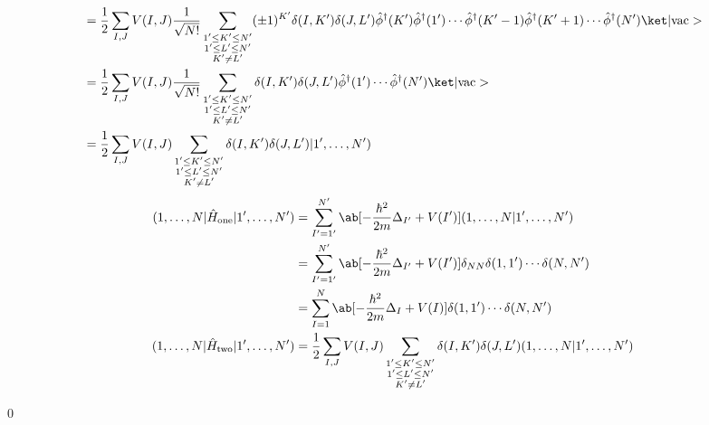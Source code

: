 \documentclass[uplatex,dvipdfmx,a4paper,11pt]{jlreq}
\makeatletter
\numberwithin{equation}{section}
\theoremstyle{definition}
\renewenvironment{proof}[1][\proofname]{\par
  \normalfont
  \topsep6\p@\@plus6\p@ \trivlist
  \item[\hskip\labelsep{\bfseries #1}\@addpunct{\bfseries}]\ignorespaces\quad\par
}{
  \qed\endtrivlist\@endpefalse
}
\renewcommand\proofname{証明}
\makeatother
\begin{document}
\begin{proof}
\begin{align}
     & = \frac{1}{2}\sum_{I,J}V(I, J)\frac{1}{\sqrt{N!}}\sum_{\substack{1'\leq K'\leq N'                                                                                                                                                                                                  \\ 1'\leq L'\leq N' \\ K' \neq L'}}(\pm 1)^{K'}\delta(I, K')\delta(J, L')\hat{\phi}^\dagger(K')\hat{\phi}^\dagger(1')\cdots\hat{\phi}^\dagger(K' - 1)\hat{\phi}^\dagger(K' + 1)\cdots\hat{\phi}^\dagger(N')\ket|\mathrm{vac}>                                                                        \\
     & = \frac{1}{2}\sum_{I,J}V(I, J)\frac{1}{\sqrt{N!}}\sum_{\substack{1'\leq K'\leq N'                                                                                                                                                                                                  \\ 1'\leq L'\leq N' \\ K' \neq L'}}\delta(I, K')\delta(J, L')\hat{\phi}^\dagger(1')\cdots\hat{\phi}^\dagger(N')\ket|\mathrm{vac}>                                                                        \\
     & = \frac{1}{2}\sum_{I,J}V(I, J)\sum_{\substack{1'\leq K'\leq N'                                                                                                                                                                                                                     \\ 1'\leq L'\leq N' \\ K' \neq L'}}\delta(I, K')\delta(J, L')|1',\ldots,N')
  \end{align}
  \begin{align}
    (1,\ldots,N|\hat{H}_{\mathrm{one}}|1',\ldots,N') & = \sum_{I' = 1'}^{N'}\ab[-\frac{\hbar^2}{2m}\Delta_{I'} + V(I')](1,\ldots,N|1',\ldots,N')                   \\
                                                     & = \sum_{I' = 1'}^{N'}\ab[-\frac{\hbar^2}{2m}\Delta_{I'} + V(I')]\delta_{NN}\delta(1, 1')\cdots\delta(N, N') \\
                                                     & = \sum_{I = 1}^{N}\ab[-\frac{\hbar^2}{2m}\Delta_{I} + V(I)]\delta(1, 1')\cdots\delta(N, N')                 \\
    (1,\ldots,N|\hat{H}_{\mathrm{two}}|1',\ldots,N') & = \frac{1}{2}\sum_{I,J}V(I, J)\sum_{\substack{1'\leq K'\leq N'                                              \\ 1'\leq L'\leq N' \\ K' \neq L'}}\delta(I, K')\delta(J, L')(1,\ldots,N|1',\ldots,N') \\

\end{align}
\end{proof}
\end{document}
